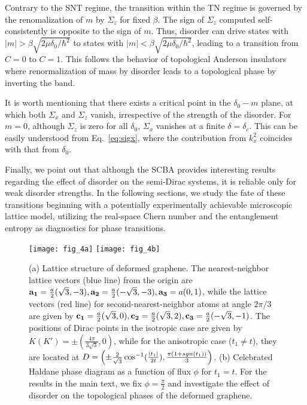 \documentclass[aps,prb,showpacs,twocolumn,floats]{revtex4-1}
\begin{document}
Contrary to the SNT regime, the transition within the TN regime is governed by the renomalization of $m$ by $\Sigma_z$ for fixed $\beta$. The sign of $\Sigma_z$ computed self-consistently is opposite to the sign of $m$. Thus, disorder can drive states with $|m|> \beta\sqrt{2\mu\delta_0/\hbar^2}$ to states with $|m|< \beta\sqrt{2\mu\delta_0/\hbar^2}$, leading to a transition from $C=0$ to $C=1$. This follows the behavior of topological Anderson insulators \cite{li,benakker} where renormalization of mass by disorder leads to a topological phase by inverting the band.

It is worth mentioning that there exists a critical point in the $\delta_0-m$ plane, at which both $\Sigma_x$ and $\Sigma_z$ vanish, irrespective of the strength of the disorder. For $m=0$, although $\Sigma_z$ is zero for all $\delta_0$, $\Sigma_x$ vanishes at a finite $\delta = \delta_c$. This can be easily understood from Eq.~\eqref{eq:sigx}, where the contribution from $k_x^2$ coincides with that from $\delta_0$.

Finally, we point out that although the SCBA provides interesting results regarding the effect of disorder on the semi-Dirac systems, it is reliable only for weak disorder strengths. In the following sections, we study the fate of these transitions beginning with a potentially experimentally achievable microscopic lattice model, utilizing the real-space Chern number and the entanglement entropy as diagnostics for phase transitions.      

\begin{figure}
\texttt{[image: fig\_4a]}
\texttt{[image: fig\_4b]}\\
\caption{(a) Lattice structure of deformed graphene. The nearest-neighbor lattice vectors (blue line) from the origin are ${\bf a_1}=\frac{a}{2}(\sqrt{3},-3), {\bf a_2}=\frac{a}{2}(-\sqrt{3},-3), {\bf a_3}=a(0,1)$, while the lattice vectors (red line) for second-nearest-neighbor atoms at angle $2\pi/3$ are given by ${\bf c_1}=\frac{a}{2}(\sqrt{3},0), {\bf c_2}=\frac{a}{2}(\sqrt{3},2), {\bf c_3}=\frac{a}{2}(-\sqrt{3},-1)$.  The positions of Dirac points in the isotropic case are given by $K(K')=\pm(\frac{4\pi}{3\sqrt{3}},0)$, while for the anisotropic case ($t_1\ne t$), they are located at $D=\left(\pm\frac{2}{\sqrt{3}}\cos^{-1}(\frac{|t_1|}{2t}),{\pi(1+sgn(t_1)) \over 3}\right)$. (b) Celebrated Haldane phase diagram as a function of flux $\phi$ for $t_1=t$. For the results in the main text, we fix $\phi=\frac{\pi}{2}$ and investigate the effect of disorder on the topological phases of the deformed graphene.}
\label{fig:graphene}
\end{figure} 
\end{document}
